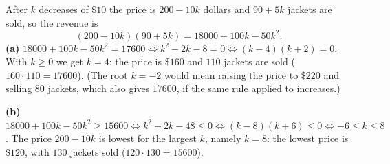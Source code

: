 After $k$ decreases of $\$10$ the price is $200-10k$ dollars and $90+5k$ jackets are sold, so the revenue is
\[
(200-10k)(90+5k)=18000+100k-50k^2 .
\]
\textbf{(a)} $18000+100k-50k^2=17600\iff k^2-2k-8=0\iff(k-4)(k+2)=0$. With $k\ge0$ we get $k=4$: the price is $\boxed{\$160}$ and $\boxed{110}$ jackets are sold ($160\cdot110=17600$). (The root $k=-2$ would mean raising the price to $\$220$ and selling $80$ jackets, which also gives $17600$, if the same rule applied to increases.)

\textbf{(b)} $18000+100k-50k^2\ge15600\iff k^2-2k-48\le0\iff(k-8)(k+6)\le0\iff-6\le k\le8$. The price $200-10k$ is lowest for the largest $k$, namely $k=8$: the lowest price is $\boxed{\$120}$, with $\boxed{130}$ jackets sold ($120\cdot130=15600$).
